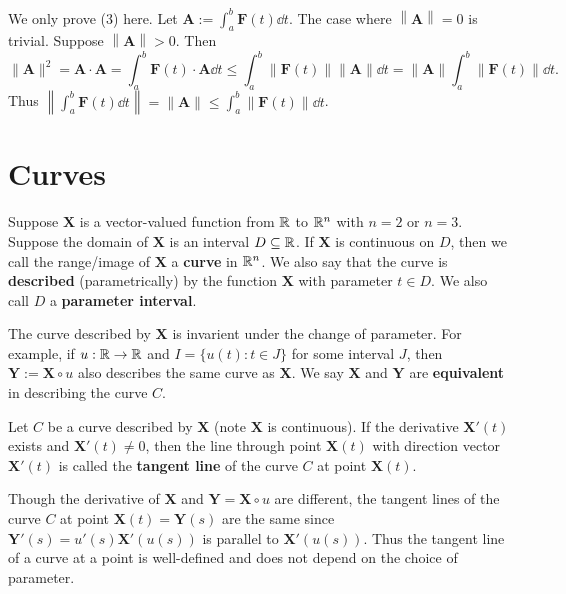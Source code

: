     \begin{proofenv}
        We only prove (3) here. Let $\bm A:= \displaystyle \int_a^b \bm F(t) \dd t$. The case where $\left\|\bm A\right\| = 0 $ is trivial. Suppose $\left\|\bm A\right\| > 0$. Then
        $$ \|\bm A\|^2 = \bm A \cdot \bm A = \int_a^b \bm F(t) \cdot \bm A \dd t \le \int_a^b \| \bm F(t)\| \| \bm A\| \dd t = \| \bm A\| \int_a^b \| \bm F(t)\| \dd t. $$
        Thus $\displaystyle \left\|\int_a^b \bm F(t) \dd t\right\| = \| \bm A\| \le \int_a^b \| \bm F(t)\| \dd t$.
    \end{proofenv}
    \section{Curves}
    \begin{definitionenv}
        Suppose $\bm X$ is a vector-valued function from $\mathbb{R}$ to $\mathbb{R}^n$ with $n=2$ or $n=3$. Suppose the domain of $\bm X$ is an interval $D\subseteq \mathbb{R}$. If $\bm X$ is continuous on $D$, then we call the range/image of $\bm X$ a \textbf{curve} in $\mathbb{R}^n$. We also say that the curve is \textbf{described} (parametrically) by the function $\bm X$ with parameter $t\in D$. We also call $D$ a \textbf{parameter interval}.
    \end{definitionenv}
    \begin{remarkenv}
        The curve described by $\bm X$ is invarient under the change of parameter. For example, if $u:\mathbb{R} \to \mathbb{R}$ and $I = \{u(t) :t \in J\}$ for some interval $J$, then $\bm Y := \bm X\circ u$ also describes the same curve as $\bm X$. We say $\bm X$ and $\bm Y$ are \textbf{equivalent} in describing the curve $C$.
    \end{remarkenv}
    \begin{definitionenv}
        Let $C$ be a curve described by $\bm X$ (note $\bm X$ is continuous). If the derivative $\bm X'(t)$ exists and $\bm X'(t) \ne 0$, then the line through point $\bm X(t)$ with direction vector $\bm X'(t)$ is called the \textbf{tangent line} of the curve $C$ at point $\bm X(t)$.
    \end{definitionenv}
    \begin{remarkenv}
        Though the derivative of $\bm X$ and $\bm Y=\bm X\circ u$ are different, the tangent lines of the curve $C$ at point $\bm X(t) = \bm Y(s)$ are the same since $\bm Y'(s) = u'(s) \bm X'(u(s))$ is parallel to $\bm X'(u(s))$. Thus the tangent line of a curve at a point is well-defined and does not depend on the choice of parameter.
    \end{remarkenv}
